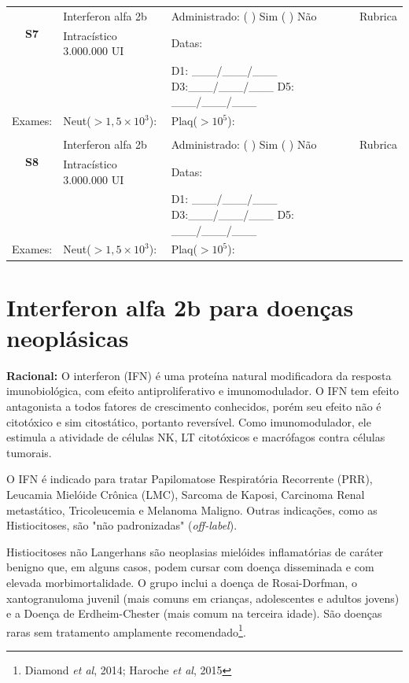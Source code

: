 \documentclass[11pt,a4paper,oldfontcommands]{memoir}
\begin{document}
\begin{center}
\begin{table}[H]
\begin{tabular}{p{1.3cm}p{4.2cm}|p{8cm}|p{}}
    \hline
    \multicolumn{1}{c|}{\multirow{2}{*}{\textbf{S7}}}&{Interferon alfa 2b}&{Administrado: (  ) Sim (  ) Não}&{Rubrica}\\
    \multicolumn{1}{c|}{}&{Intracístico 3.000.000 UI}&{Datas:}&\\
    \multicolumn{1}{c|}{}&{}&{D1: \_\_\_/\_\_\_/\_\_\_ D3:\_\_\_/\_\_\_/\_\_\_ D5: \_\_\_/\_\_\_/\_\_\_}&\\
    \hline
    {Exames:}&{Neut(\(>1,5\times10^3\)):}&{Plaq(\(>10^5\)):}&{}
    \\
    \hline
    \\
    \hline
    \multicolumn{1}{c|}{\multirow{2}{*}{\textbf{S8}}}&{Interferon alfa 2b}&{Administrado: (  ) Sim (  ) Não}&{Rubrica}\\
    \multicolumn{1}{c|}{}&{Intracístico 3.000.000 UI}&{Datas:}&\\
    \multicolumn{1}{c|}{}&{}&{D1: \_\_\_/\_\_\_/\_\_\_ D3:\_\_\_/\_\_\_/\_\_\_ D5: \_\_\_/\_\_\_/\_\_\_}&\\
    \hline
    {Exames:}&{Neut(\(>1,5\times10^3\)):}&{Plaq(\(>10^5\)):}&{}
    \\
    \hline
\end{tabular}
\end{table}
\end{center}

\section{Interferon alfa 2b para doenças neoplásicas}
{\let\thefootnote\relax{}}

\textbf{Racional:} O interferon (IFN) é uma proteína natural modificadora da resposta imunobiológica, com efeito antiproliferativo e imunomodulador. O IFN tem efeito antagonista a todos fatores de crescimento conhecidos, porém seu efeito não é citotóxico e sim citostático, portanto reversível. Como imunomodulador, ele estimula a atividade de células NK, LT citotóxicos e macrófagos contra células tumorais. 

O IFN é indicado para tratar Papilomatose Respiratória Recorrente (PRR), Leucamia Mielóide Crônica (LMC), Sarcoma de Kaposi, Carcinoma Renal metastático, Tricoleucemia e Melanoma Maligno. Outras indicações, como as Histiocitoses, são "não padronizadas" (\textit{off-label}).

Histiocitoses não Langerhans são neoplasias mielóides inflamatórias de caráter benigno que, em alguns casos, podem cursar com doença disseminada e com elevada morbimortalidade. O grupo inclui a doença de Rosai-Dorfman, o xantogranuloma juvenil (mais comuns em crianças, adolescentes e adultos jovens) e a Doença de Erdheim-Chester (mais comum na terceira idade). São doenças raras sem tratamento amplamente recomendado\footnote{Diamond \textit{et al}, 2014; Haroche \textit{et al}, 2015}.
\end{document}
